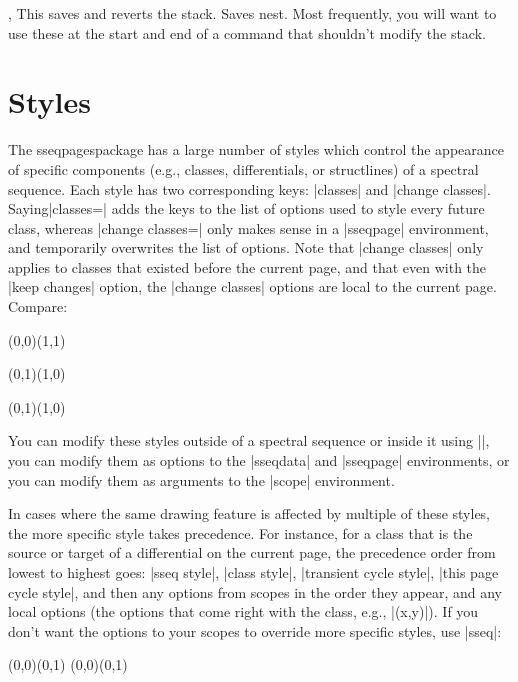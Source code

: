 \documentclass{ltxdoc}
\def\sseqpages{sseqpages}
\begin{document}
\begin{sseqdata}[name=ex1,degree={#1}{1-#1}]
\begin{commandlist}{\savestack,\restorestack}
This saves and reverts the stack. Saves nest. Most frequently, you will want to use these at the start and end of a command that shouldn't modify the stack.
\end{commandlist}


\section{Styles}
The \sseqpages\space package has a large number of styles which control the appearance of specific components (e.g., classes, differentials, or structlines) of a spectral sequence. Each style has two corresponding keys: |classes| and |change classes|.  Saying|classes=| adds the keys to the list of options used to style every future class, whereas |change classes=| only makes sense in a |sseqpage| environment, and temporarily overwrites the list of options. Note that |change classes| only applies to classes that existed before the current page, and that even with the |keep changes| option, the |change classes| options are local to the current page. Compare:
\begin{codeexample}[width=8cm]
\begin{sseqdata}[name=stylesex]
\class(0,0)\class(1,1)
\end{sseqdata}
\begin{sseqpage}[name=stylesex,classes={fill,blue},
    title={change new classes}
]
\class(0,1)\class(1,0)
\end{sseqpage}
\quad
\begin{sseqpage}[name=stylesex,
    change classes={fill,blue},
    title={change old classes}
]
\class(0,1)\class(1,0)
\end{sseqpage}
\end{codeexample}

You can modify these styles outside of a spectral sequence or inside it using |\sseqset|, you can modify them as options to the |sseqdata| and |sseqpage| environments, or you can modify them as arguments to the |scope| environment.

In cases where the same drawing feature is affected by multiple of these styles, the more specific style takes precedence. For instance, for a class that is the source or target of a differential on the current page, the precedence order from lowest to highest goes: |sseq style|, |class style|, |transient cycle style|, |this page cycle style|, and then any options from scopes in the order they appear, and any local options (the options that come right with the class, e.g., |(x,y)|). If you don't want the options to your scopes to override more specific styles, use |sseq|:
\begin{codeexample}[width=8cm]
\begin{sseqpage}[classes=blue,
    title style={align=center,text width=2.4cm},
    title={everything is orange}]
\begin{scope}[orange]
\class(0,0)\class(0,1)
\structline(0,0)(0,1)
\end{scope}
\end{sseqpage}


\end{codeexample}
\end{sseqdata}
\end{document}
